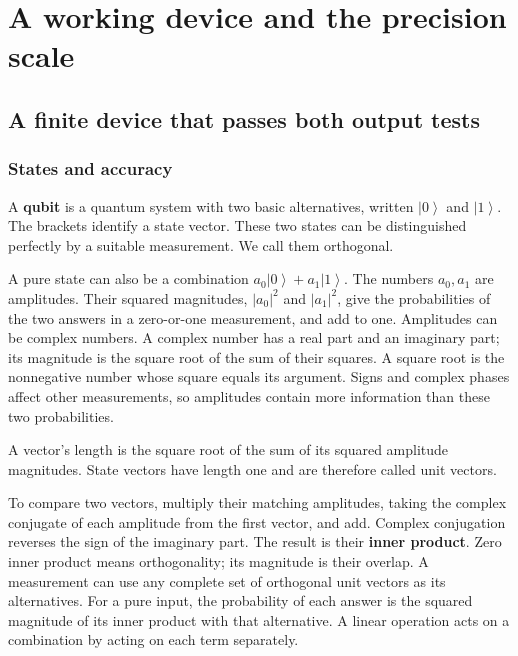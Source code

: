 \documentclass[11pt,letterpaper]{article}
\begin{document}
\section{A working device and the precision scale}\label{sec:device}

\subsection{A finite device that passes both output tests}\label{subsec:finite-device}

\subsubsection{States and accuracy}\label{states-and-accuracy}

A \textbf{qubit} is a quantum system with two basic alternatives, written \(\left| 0 \right\rangle\) and \(\left| 1 \right\rangle\). The brackets identify a state vector. These two states can be distinguished perfectly by a suitable measurement. We call them orthogonal.

A pure state can also be a combination \(a_{0}\left| 0 \right\rangle + a_{1}\left| 1 \right\rangle\). The numbers \(a_{0},a_{1}\) are amplitudes. Their squared magnitudes, \(\left| a_{0} \right|^{2}\) and \(\left| a_{1} \right|^{2}\), give the probabilities of the two answers in a zero-or-one measurement, and add to one. Amplitudes can be complex numbers. A complex number has a real part and an imaginary part; its magnitude is the square root of the sum of their squares. A square root is the nonnegative number whose square equals its argument. Signs and complex phases affect other measurements, so amplitudes contain more information than these two probabilities.

A vector's length is the square root of the sum of its squared amplitude magnitudes. State vectors have length one and are therefore called unit vectors.

To compare two vectors, multiply their matching amplitudes, taking the complex conjugate of each amplitude from the first vector, and add. Complex conjugation reverses the sign of the imaginary part. The result is their \textbf{inner product}. Zero inner product means orthogonality; its magnitude is their overlap. A measurement can use any complete set of orthogonal unit vectors as its alternatives. For a pure input, the probability of each answer is the squared magnitude of its inner product with that alternative. A linear operation acts on a combination by acting on each term separately.
\end{document}
